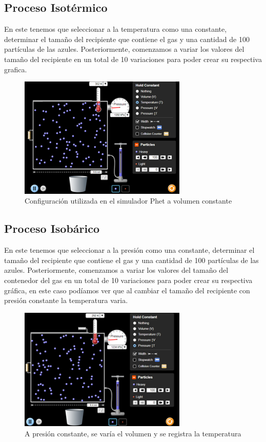 \documentclass[journal,transmag]{IEEEtran}
\begin{document}
\subsection{\textbf{Proceso Isotérmico}}

En este tenemos que seleccionar a la temperatura como una constante, determinar el tamaño del recipiente que contiene el gas y una cantidad de 100 partículas de las azules. Posteriormente, comenzamos a variar los valores del tamaño del recipiente en un total de 10 variaciones para poder crear su respectiva grafica. 
\begin{figure}[!h]
				\center
				\includegraphics[width=8cm]{img/isote.png}
				\caption{Configuración utilizada en el simulador Phet a volumen constante}
				\label{f10}
	\end{figure}


\subsection{\textbf{Proceso Isobárico}}
En este tenemos que seleccionar a la presión como una constante, determinar el tamaño del recipiente que contiene el gas y una cantidad de 100 partículas de las azules. Posteriormente, comenzamos a variar los valores del tamaño del contenedor del gas en un total de 10 variaciones para poder crear su respectiva gráfica, en este caso podíamos ver que al cambiar el tamaño del recipiente con presión constante la temperatura varia. 

\begin{figure}[!h]
				\center
				\includegraphics[width=8cm]{img/isoba1.png}
				\caption{A presión constante, se varía el volumen y se registra la temperatura}
				\label{f11}
	\end{figure}
	
\end{document}
